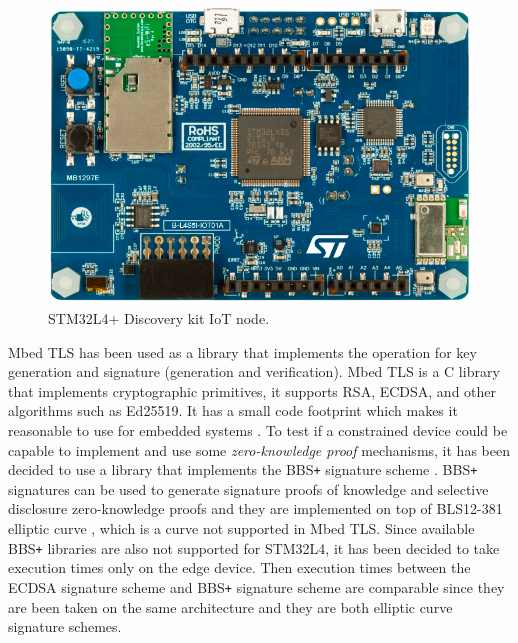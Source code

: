 \begin{figure}[h!]
    \centering
    \includegraphics[scale=0.30]{./chapters/images/STM32L4+ Discovery kit IoT node.jpeg}
    \caption{STM32L4+ Discovery kit IoT node\cite{stm32-board-product}.}
    \label{stm-board}
\end{figure}

Mbed TLS \cite{mbed-tls} has been used as a library that implements the operation for key generation and signature (generation and verification). Mbed TLS is a C library that implements cryptographic primitives, it supports RSA, ECDSA, and other algorithms such as Ed25519. It has a small code footprint which makes it reasonable to use for embedded systems \cite{mbed-tls}. To test if a constrained device could be capable to implement and use some \textit{zero-knowledge proof} mechanisms, it has been decided to use a library that implements the BBS\texttt{+} signature scheme \cite{bbsplus}. BBS\texttt{+} signatures can be used to generate signature proofs of knowledge and selective disclosure zero-knowledge proofs \cite{bbs-rust} and they are implemented on top of BLS12-381 elliptic curve \cite{bls-curve}, which is a curve not supported in Mbed TLS. Since available BBS\texttt{+} libraries are also not supported for STM32L4, it has been decided to take execution times only on the edge device. Then execution times between the ECDSA signature scheme and BBS\texttt{+} signature scheme are comparable since they are been taken on the same architecture and they are both elliptic curve signature schemes.

